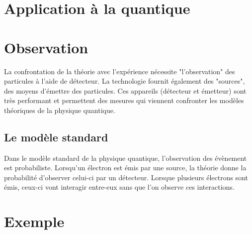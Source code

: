 

\section{Application à la quantique}


\section{Observation}

La confrontation de la théorie avec l'expérience nécessite "l'observation" des particules à l'aide de détecteur. La technologie fournit également des "sources", des moyens d'émettre des particules. Ces appareils (détecteur et émetteur) sont très performant et permettent des mesures qui viennent confronter les modèles théoriques de la physique quantique.

\subsection{Le modèle standard}

Dans le modèle standard de la physique quantique, l'observation des évènement est probabiliste. Lorsqu'un électron est émis par une source, la théorie donne la probabilité d'observer celui-ci par un détecteur. Lorsque plusieurs électrons sont émis, ceux-ci vont interagir entre-eux sans que l'on observe ces interactions.

\section{Exemple}

